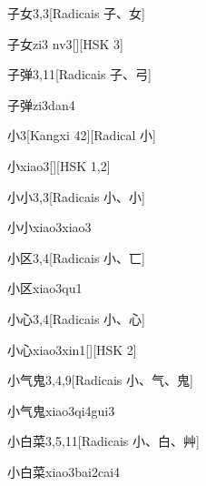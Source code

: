 \begin{entry}{子女}{3,3}[Radicais ⼦、⼥]
  \begin{phonetics}{子女}{zi3 nv3}[][HSK 3]
  \end{phonetics}
\end{entry}

\begin{entry}{子弹}{3,11}[Radicais ⼦、⼸]
  \begin{phonetics}{子弹}{zi3dan4}
  \end{phonetics}
\end{entry}

\begin{entry}{小}{3}[Kangxi 42][Radical ⼩]
  \begin{phonetics}{小}{xiao3}[][HSK 1,2]
  \end{phonetics}
\end{entry}

\begin{entry}{小小}{3,3}[Radicais ⼩、⼩]
  \begin{phonetics}{小小}{xiao3xiao3}
  \end{phonetics}
\end{entry}

\begin{entry}{小区}{3,4}[Radicais ⼩、⼖]
  \begin{phonetics}{小区}{xiao3qu1}
  \end{phonetics}
\end{entry}

\begin{entry}{小心}{3,4}[Radicais ⼩、⼼]
  \begin{phonetics}{小心}{xiao3xin1}[][HSK 2]
  \end{phonetics}
\end{entry}

\begin{entry}{小气鬼}{3,4,9}[Radicais ⼩、⽓、⿁]
  \begin{phonetics}{小气鬼}{xiao3qi4gui3}
  \end{phonetics}
\end{entry}

\begin{entry}{小白菜}{3,5,11}[Radicais ⼩、⽩、⾋]
  \begin{phonetics}{小白菜}{xiao3bai2cai4}
  \end{phonetics}
\end{entry}

